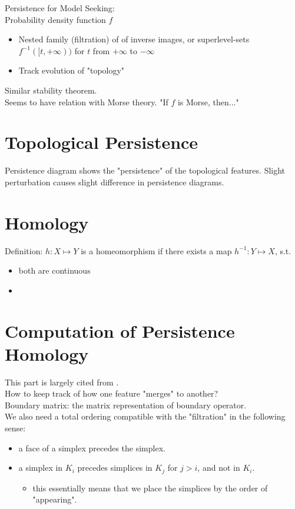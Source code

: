 \documentclass[10pt,a4paper]{report}
\begin{document}
Persistence for Model Seeking:\\
Probability density function $f$\\
\begin{itemize}
	\item Nested family (filtration) of of inverse images, or superlevel-sets $f^{-1}([t,+\infty))$ for 			  $t$ from $+\infty$ to $-\infty$
	\item Track evolution of "topology"
\end{itemize}
Similar stability theorem.\\
Seems to have relation with Morse theory. "If $f$ is Morse, then..."\\

\section{Topological Persistence}
Persistence diagram shows the "persistence" of the topological features.
Slight perturbation causes slight difference in persistence diagrams.

\section{Homology}
Definition: $h:X\mapsto Y$ is a homeomorphism if there exists a map $h^{-1}:Y\mapsto X$, s.t.
\begin{itemize}
	\item both are continuous
	\item
\end{itemize}



\section{Computation of Persistence Homology}
This part is largely cited from \cite{Otter2017}.\\
How to keep track of how one feature "merges" to another?\\
Boundary matrix: the matrix representation of boundary operator.\\
We also need a total ordering compatible with the "filtration" in the following sense:
\begin{itemize}
	\item a face of a simplex precedes the simplex.
	\item a simplex in $K_i$ precedes simplices in $K_j$ for $j>i$, and not in $K_i$.
	\begin{itemize}
		\item this essentially means that we place the simplices by the order of "appearing".
	\end{itemize}
\end{itemize}
\end{document}
